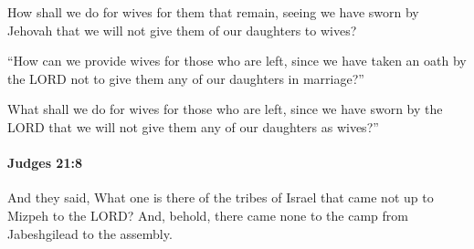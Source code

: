 			\begin{versebox}
					\item[BHS] 
					\item[ASV] How shall we do for wives for them that remain, seeing we have sworn by Jehovah that we will not give them of our daughters to wives?
					\item[NIV] “How can we provide wives for those who are left, since we have taken an oath by the LORD not to give them any of our daughters in marriage?”
					\item[NRSV] What shall we do for wives for those who are left, since we have sworn by the LORD that we will not give them any of our daughters as wives?”
			\end{versebox}

		\paragraph{Judges 21:8} %
			\label{JUDGES-21-8}

			And they said, What one is there of the tribes of Israel that came not up to Mizpeh to the LORD? And, behold, there came none to the camp from Jabeshgilead to the assembly.

